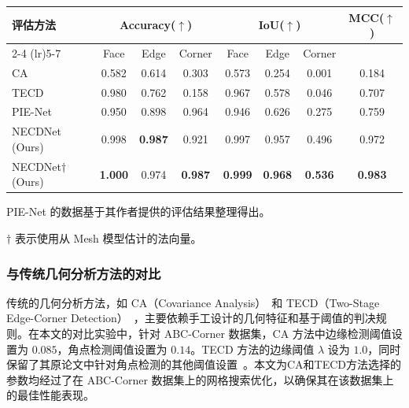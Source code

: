 \begin{table}[ht]
\begin{threeparttable}
        \setlength{\tabcolsep}{9.3pt}
        \begin{tabular}{l ccc ccc c}
        \toprule
        评估方法 & \multicolumn{3}{c}{Accuracy($\uparrow$)} & \multicolumn{3}{c}{IoU($\uparrow$)} & MCC($\uparrow$) \\
        \cmidrule(lr){2-4} \cmidrule(lr){5-7} 
         & Face & Edge & Corner & Face & Edge & Corner & \\
        \midrule
        CA~\cite{bazazian_fast_2015} & 0.582 & 0.614 & 0.303 & 0.573 & 0.254 & 0.001 & 0.184 \\
        TECD~\cite{ahmed_edge_2018} & 0.980 & 0.762 & 0.158 & 0.967 & 0.578 & 0.046 & 0.707 \\
        PIE-Net~\cite{wang_pienet_2020} & 0.950 & 0.898 & 0.964 & 0.946 & 0.626 & 0.275 & 0.759 \\
        NECDNet (Ours) & 0.998 & \textbf{0.987}& 0.921 & 0.997 & 0.957 & 0.496 & 0.972 \\
        NECDNet$\dagger$ (Ours) & \textbf{1.000}& 0.974 & \textbf{0.987}& \textbf{0.999}& \textbf{0.968}& \textbf{0.536}& \textbf{0.983}\\
        \bottomrule
        \end{tabular}
        \label{tab:metrics_result_part2}
        \begin{tablenotes}
            \footnotesize
            \item PIE-Net 的数据基于其作者提供的评估结果整理得出。
            \item $\dagger$ 表示使用从 Mesh 模型估计的法向量。 
         \end{tablenotes}
    \end{threeparttable}
\end{table}

\subsubsection{与传统几何分析方法的对比}

传统的几何分析方法，如 CA（Covariance Analysis）~\cite{bazazian_fast_2015}和 TECD（Two-Stage Edge-Corner Detection）~\cite{ahmed_edge_2018}，主要依赖手工设计的几何特征和基于阈值的判决规则。在本文的对比实验中，针对 ABC-Corner 数据集，CA 方法中边缘检测阈值设置为 $0.085$，角点检测阈值设置为 $0.14$。TECD 方法的边缘阈值 $\lambda$ 设为 $1.0$，同时保留了其原论文中针对角点检测的其他阈值设置~\cite{ahmed_edge_2018}。本文为CA和TECD方法选择的参数均经过了在 ABC-Corner 数据集上的网格搜索优化，以确保其在该数据集上的最佳性能表现。

